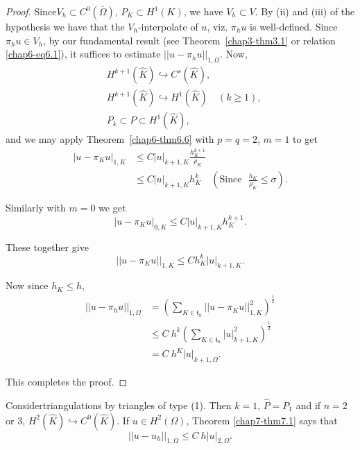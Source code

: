 \begin{proof}
Since\pageoriginale $V_{h}\subset C^{0}(\overline{\Omega})$,
$P_{K}\subset H^{1}(K)$, we have $V_{h}\subset V$. By (ii) and (iii)
of the hypothesis we have that the $V_{h}$-interpolate of $u$, viz.\@
$\pi_{h}u$ is well-defined. Since $\pi_{h}u\in V_{h}$, by our
fundamental result (see Theorem~\ref{chap3-thm3.1} or relation
\eqref{chap6-eq6.1}), it suffices to estimate
$||u-\pi_{h}u||_{1,\Omega}$. Now,
\begin{align*}
& H^{k+1}(\hat{K})\hookrightarrow C^{s}(\hat{K}),\\
& H^{k+1}(\hat{K})\hookrightarrow H^{1}(\hat{K})\quad (k\geq 1),\\
& P_{k}\subset P\subset H^{1}(\hat{K}),
\end{align*}
and we may apply Theorem~\ref{chap6-thm6.6} with $p=q=2$, $m=1$ to get
\begin{equation*}
\begin{split}
|u-\pi_{K}u|_{1,K} &\leq C|u|_{k+1,K}\frac{h^{k+1}_{K}}{\rho_{K}}\\
&\leq C|u|_{k+1,K}h^{k}_{K}\quad(\text{Since~ }
\frac{h_{K}}{\rho_{K}}\leq \sigma).
\end{split}\tag{7.6}\label{chap7-eq7.6}
\end{equation*}

Similarly with $m=0$ we get
\begin{equation*}
|u-\pi_{K}u|_{0,K}\leq
C|u|_{k+1,K}h^{k+1}_{K}.\tag{7.7}\label{chap7-eq7.7} 
\end{equation*}

These together give
\begin{equation*}
||u-\pi_{K}u||_{1,K}\leq C
h^{k}_{K}|u|_{k+1,K}.\tag{7.8}\label{chap7-eq7.8} 
\end{equation*}

Now since $h_{K}\leq h$,
\begin{align*}
||u-\pi_{h}u||_{1,\Omega} &=
\left(\sum_{K\in\mathfrak{t}_{h}}||u-\pi_{K}u||^{2}_{1,K}\right)^{\frac{1}{2}}\\
&\leq
C\ h^{k}\left(\sum_{K\in\mathfrak{t}_{h}}|u|^{2}_{k+1,K}\right)^{\frac{1}{2}}\\
&= C\ h^{K}|u|_{k+1,\Omega}.
\end{align*}

This completes the proof.
\end{proof}

\begin{example}\label{chap7-exam7.1}
Consider\pageoriginale triangulations by triangles of type (1). Then $k=1$,
$\hat{P}=P_{1}$ and if $n=2$ or $3$, $H^{2}(\hat{K})\hookrightarrow
C^{0}(\hat{K})$. If $u\in H^{2}(\Omega)$, Theorem \ref{chap7-thm7.1}
says that
$$
||u-u_{h}||_{1,\Omega}\leq C\ h|u|_{2,\Omega}.
$$
\end{example}

